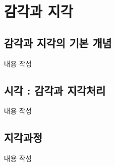 \section{감각과 지각}

\subsection{감각과 지각의 기본 개념}
내용 작성

\subsection{시각 : 감각과 지각처리}
내용 작성

\subsection{지각과정}
내용 작성
